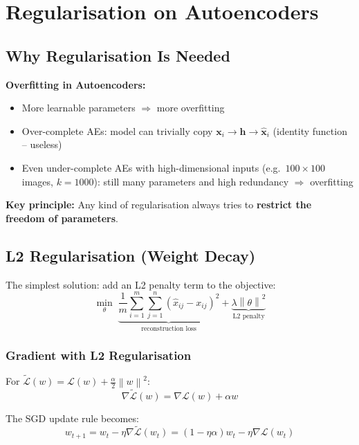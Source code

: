 \documentclass[12pt,a4paper]{article}
\newcommand{\norm}[1]{\left\|#1\right\|}
\newcommand{\vx}{\mathbf{x}}
\newcommand{\vh}{\mathbf{h}}
\newcommand{\hatx}{\hat{\mathbf{x}}}
\newcommand{\Loss}{\mathcal{L}}
\begin{document}
\section{Regularisation on Autoencoders}

\subsection{Why Regularisation Is Needed}

\begin{alertbox}
\textbf{Overfitting in Autoencoders:}
\begin{itemize}
  \item More learnable parameters $\Rightarrow$ more overfitting
  \item Over-complete AEs: model can trivially copy $\vx_i \to \vh \to \hatx_i$ (identity function -- useless)
  \item Even under-complete AEs with high-dimensional inputs (e.g.\ $100\times100$ images, $k=1000$): still many parameters and high redundancy $\Rightarrow$ overfitting
\end{itemize}
\textbf{Key principle:} Any kind of regularisation always tries to \textbf{restrict the freedom of parameters}.
\end{alertbox}

\subsection{L2 Regularisation (Weight Decay)}

The simplest solution: add an L2 penalty term to the objective:
\[
\min_{\theta}\;
\underbrace{\frac{1}{m}\sum_{i=1}^{m}\sum_{j=1}^{n}(\hat{x}_{ij} - x_{ij})^2}_{\text{reconstruction loss}}
+ \underbrace{\lambda\norm{\theta}^2}_{\text{L2 penalty}}
\]

\subsubsection{Gradient with L2 Regularisation}

For $\tilde{\Loss}(w) = \Loss(w) + \frac{\alpha}{2}\norm{w}^2$:
\[
\nabla\tilde{\Loss}(w) = \nabla\Loss(w) + \alpha w
\]

The SGD update rule becomes:
\[
w_{t+1} = w_t - \eta\nabla\tilde{\Loss}(w_t)
= (1 - \eta\alpha)w_t - \eta\nabla\Loss(w_t)
\]
\end{document}
